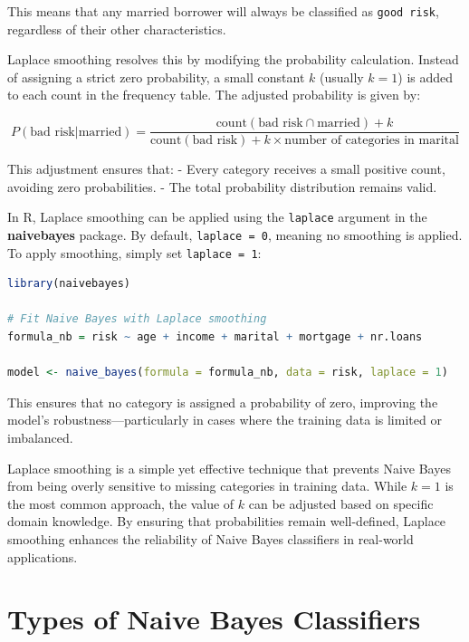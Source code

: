 \documentclass[
]{book}
\newcommand{\passthrough}[1]{#1}
\theoremstyle{definition}
\theoremstyle{definition}
\theoremstyle{definition}
\theoremstyle{definition}
\theoremstyle{remark}
\begin{document}
This means that any married borrower will always be classified as \passthrough{\lstinline!good risk!}, regardless of their other characteristics.

Laplace smoothing resolves this by modifying the probability calculation. Instead of assigning a strict zero probability, a small constant \(k\) (usually \(k = 1\)) is added to each count in the frequency table. The adjusted probability is given by:

\[
P(\text{bad risk} | \text{married}) = \frac{\text{count}(\text{bad risk} \cap \text{married}) + k}{\text{count}(\text{bad risk}) + k \times \text{number of categories in } \text{marital}}
\]

This adjustment ensures that:
- Every category receives a small positive count, avoiding zero probabilities.
- The total probability distribution remains valid.

In R, Laplace smoothing can be applied using the \passthrough{\lstinline!laplace!} argument in the \textbf{naivebayes} package. By default, \passthrough{\lstinline!laplace = 0!}, meaning no smoothing is applied. To apply smoothing, simply set \passthrough{\lstinline!laplace = 1!}:

\begin{lstlisting}[language=R]
library(naivebayes)

# Fit Naive Bayes with Laplace smoothing
formula_nb = risk ~ age + income + marital + mortgage + nr.loans

model <- naive_bayes(formula = formula_nb, data = risk, laplace = 1)
\end{lstlisting}

This ensures that no category is assigned a probability of zero, improving the model's robustness---particularly in cases where the training data is limited or imbalanced.

Laplace smoothing is a simple yet effective technique that prevents Naive Bayes from being overly sensitive to missing categories in training data. While \(k = 1\) is the most common approach, the value of \(k\) can be adjusted based on specific domain knowledge. By ensuring that probabilities remain well-defined, Laplace smoothing enhances the reliability of Naive Bayes classifiers in real-world applications.

\section{Types of Naive Bayes Classifiers}\label{types-of-naive-bayes-classifiers}
\end{document}
